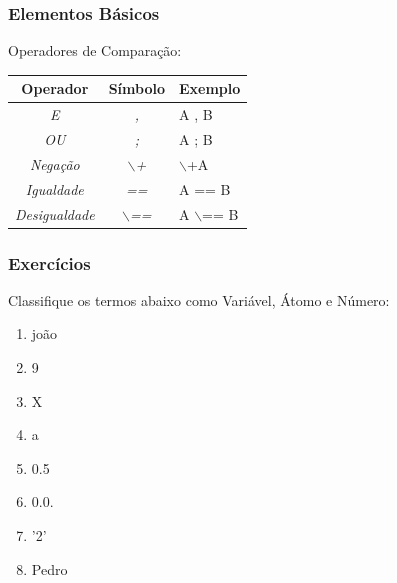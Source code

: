 \documentclass[sans]{beamer}
\begin{document}
\begin{frame}
\frametitle{Elementos Básicos}
      \begin{block}{Operadores de Comparação:}
	  \begin{center}{
	  \begin{tabular}{c|c|l}\hline \hline
	  
	    \textbf{Operador}	&  \textbf{Símbolo}	&  \textbf{Exemplo}\\ \hline \hline
	    
	    \textit{E}	&  \textit{,}	&  A , B \\ \hline 
	    \textit{OU}	&  \textit{;}	&  A ; B \\ \hline 
	    \textit{Negação}	&  \textit{$\backslash$+}	&  $\backslash$+A \\ \hline 
	    \textit{Igualdade}	&  \textit{==}	&  A == B \\ \hline 
	    \textit{Desigualdade}	&  \textit{$\backslash$==}	&  A $\backslash$== B \\ \hline \hline

	  \end{tabular}} 
	  \end{center}      
      \end{block}
\end{frame}

\begin{frame}[fragile]   %
\frametitle{Exercícios}
\begin{block}{Classifique os termos abaixo como Variável, Átomo e Número:}

\begin{enumerate}

\item joão
\item 9
\item X
\item a
\item 0.5
\item 0.0.
\item '2'
\item Pedro

\end{enumerate}
\end{block}   
\end{frame}
\end{document}
